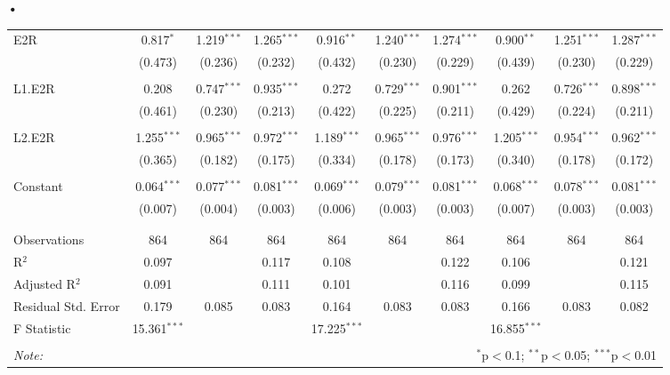 \textbf{\textbf{•}}\documentclass[a4paper]{article}
\begin{document}
\begin{table}[!htbp]
{\begin{tabular}{@{\extracolsep{5pt}}lccccccccc}
 E2R & 0.817$^{*}$ & 1.219$^{***}$ & 1.265$^{***}$ & 0.916$^{**}$ & 1.240$^{***}$ & 1.274$^{***}$ & 0.900$^{**}$ & 1.251$^{***}$ & 1.287$^{***}$ \\ 
  & (0.473) & (0.236) & (0.232) & (0.432) & (0.230) & (0.229) & (0.439) & (0.230) & (0.229) \\ 
  & & & & & & & & & \\ 
 L1.E2R & 0.208 & 0.747$^{***}$ & 0.935$^{***}$ & 0.272 & 0.729$^{***}$ & 0.901$^{***}$ & 0.262 & 0.726$^{***}$ & 0.898$^{***}$ \\ 
  & (0.461) & (0.230) & (0.213) & (0.422) & (0.225) & (0.211) & (0.429) & (0.224) & (0.211) \\ 
  & & & & & & & & & \\ 
 L2.E2R & 1.255$^{***}$ & 0.965$^{***}$ & 0.972$^{***}$ & 1.189$^{***}$ & 0.965$^{***}$ & 0.976$^{***}$ & 1.205$^{***}$ & 0.954$^{***}$ & 0.962$^{***}$ \\ 
  & (0.365) & (0.182) & (0.175) & (0.334) & (0.178) & (0.173) & (0.340) & (0.178) & (0.172) \\ 
  & & & & & & & & & \\ 
 Constant & 0.064$^{***}$ & 0.077$^{***}$ & 0.081$^{***}$ & 0.069$^{***}$ & 0.079$^{***}$ & 0.081$^{***}$ & 0.068$^{***}$ & 0.078$^{***}$ & 0.081$^{***}$ \\ 
  & (0.007) & (0.004) & (0.003) & (0.006) & (0.003) & (0.003) & (0.007) & (0.003) & (0.003) \\ 
  & & & & & & & & & \\ 
\hline \\[-1.8ex] 
Observations & 864 & 864 & 864 & 864 & 864 & 864 & 864 & 864 & 864 \\ 
R$^{2}$ & 0.097 &  & 0.117 & 0.108 &  & 0.122 & 0.106 &  & 0.121 \\ 
Adjusted R$^{2}$ & 0.091 &  & 0.111 & 0.101 &  & 0.116 & 0.099 &  & 0.115 \\ 
Residual Std. Error & 0.179 & 0.085 & 0.083 & 0.164 & 0.083 & 0.083 & 0.166 & 0.083 & 0.082 \\ 
F Statistic & 15.361$^{***}$ &  &  & 17.225$^{***}$ &  &  & 16.855$^{***}$ &  &  \\ 
\hline 
\hline \\[-1.8ex] 
\textit{Note:}  & \multicolumn{9}{r}{$^{*}$p$<$0.1; $^{**}$p$<$0.05; $^{***}$p$<$0.01} \\ 
\end{tabular} 
}
\end{table} 
\FloatBarrier
\end{document}
